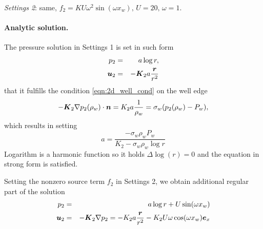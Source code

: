   \emph{Settings 2}: same, $f_2=KU\omega^2\sin(\omega x_w),\, U=20,\, \omega=1.$
  
  \paragraph{Analytic solution.} The pressure solution in Settings 1 is set in such form 
  \begin{eqnarray}
      p_2 &=& a\log r,\label{eqn:2d_press_sol1}\\
      \mathbf{\boldsymbol{u}}_2 &=& -\mathbf{\boldsymbol{K}}_2 a \frac{\mathbf{\boldsymbol{r}}}{r^2} \label{eqn:2d_vel_sol1}
  \end{eqnarray} 
  that it fulfills the condition \eqref{eqn:2d_well_cond} on the well edge
  \[ -\mathbf{\boldsymbol{K}}_2\nabla p_2(\rho_w) \cdot \mathbf{\boldsymbol{n}} = K_2a\frac{1}{\rho_w} = \sigma_w(p_2(\rho_w) - P_w),\]
  which results in setting
  \[a=\frac{-\sigma_w\rho_w P_w}{K_2 - \sigma_w\rho_w\log r}\]
  Logarithm is a harmonic function so it holds $\Delta \log(r) = 0$ and the equation in strong form is satisfied.
  
  Setting the nonzero source term $f_2$ in Settings 2, we obtain additional regular part of the solution
  \begin{eqnarray}
    p_2 &=& a\log r + U\sin(\omega x_w) \label{eqn:2d_press_sol2}\\
    \mathbf{\boldsymbol{u}}_2 &=& -\mathbf{\boldsymbol{K}}_2\nabla p_2 = -K_2 a\frac{\mathbf{\boldsymbol{r}}}{r^2} -K_2 U\omega\cos(\omega x_w)\mathbf{\boldsymbol{e}}_x \label{eqn:2d_vel_sol2}
  \end{eqnarray}
  
